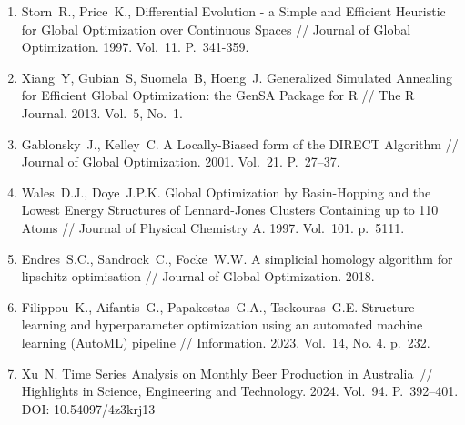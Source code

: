 \documentclass[a4paper,12pt,russian]{article}
\begin{document}
\begin{enumerate}
\item \label{rfa:enlit:differential_evolution}
Storn~R., Price~K., Differential Evolution - a Simple and Efficient Heuristic for Global Optimization over Continuous Spaces // Journal of Global Optimization. 1997. Vol.~11. P.~341-359.

\item \label{rfa:enlit:dual_annealing}
Xiang~Y, Gubian~S, Suomela~B, Hoeng~J. Generalized Simulated Annealing for Efficient Global Optimization: the GenSA Package for R // The R Journal. 2013. Vol.~5, No.~1.

\item \label{rfa:enlit:direct}
Gablonsky~J., Kelley~C. A Locally-Biased form of the DIRECT Algorithm // Journal of Global Optimization. 2001. Vol.~21. P.~27--37.

\item \label{rfa:enlit:basinhopping}
Wales~D.J., Doye~J.P.K. Global Optimization by Basin-Hopping and the Lowest Energy Structures of Lennard-Jones Clusters Containing up to 110 Atoms // Journal of Physical Chemistry A. 1997. Vol.~101. p.~5111.

\item \label{rfa:enlit:shgo}
Endres~S.C., Sandrock~C., Focke~W.W. A simplicial homology algorithm for lipschitz optimisation // Journal of Global Optimization. 2018.

\item \label{rfa:enlit:nikitin2022automated}
Filippou~K., Aifantis~G., Papakostas~G.A., Tsekouras~G.E. Structure learning and hyperparameter optimization using an automated machine learning ({AutoML}) pipeline // Information. 2023. Vol.~14, No. 4. p.~232.

\item \label{rfa:enlit:MonthlyBeerArticle}
Xu~N. Time Series Analysis on Monthly Beer Production in Australia~// Highlights in Science, Engineering and Technology. 2024. Vol.~94. P.~392--401. DOI: 10.54097/4z3krj13




	


\end{enumerate}
\end{document}

